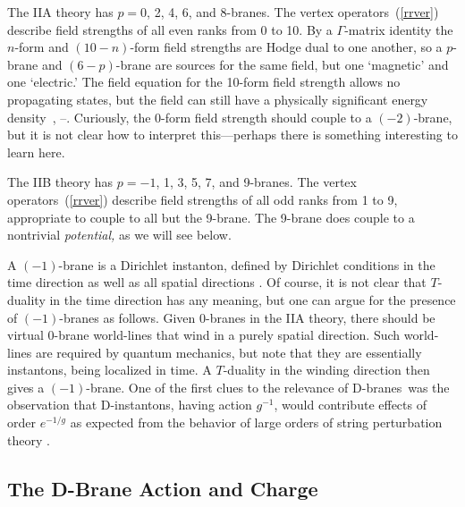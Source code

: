 \documentclass[12pt]{article}
\begin{document}
The IIA theory has $p = 0$, 2, 4, 6, and 8-branes.  The vertex
operators~(\ref{rrver}) describe field strengths of all even ranks from 0
to 10.  By a
$\Gamma$-matrix identity the $n$-form and $(10-n)$-form field strengths
are Hodge dual to one another, so a $p$-brane and $(6-p)$-brane are
sources for the same field, but one `magnetic' and one `electric.'  The field
equation for the 10-form field strength allows no propagating states, but
the field can still have a physically significant energy
density~\cite{joeone}, \cite{romans}--\cite{joeandy}. 
Curiously, the 0-form field strength should couple to a $(-2)$-brane, but it
is not clear how to interpret this---perhaps there is something interesting
to learn here. 

The IIB theory has $p = -1$, 1, 3, 5, 7, and 9-branes.  The vertex 
operators~(\ref{rrver}) describe field strengths of all odd ranks from 1 to
9, appropriate to couple to all but the 9-brane.  The 9-brane does couple to
a nontrivial {\it potential,} as we will see below.

A $(-1)$-brane is a
Dirichlet instanton, defined by Dirichlet conditions in the time direction
as well as all spatial directions \cite{parton}. Of course, it is not clear
that
$T$-duality in the time direction has any meaning, but one can argue for
the presence of $(-1)$-branes as follows.  Given $0$-branes in the IIA
theory, there should be virtual $0$-brane world-lines that wind in a
purely spatial direction.  Such world-lines are required by quantum
mechanics, but note that they are essentially instantons, being localized
in time.  A $T$-duality in the winding direction then gives a $(-1)$-brane.
One of the first clues to the relevance of D-branes\, \cite{joecomb} was the
observation that D-instantons, having action $g^{-1}$, would contribute
effects of order $e^{-1/g}$ as expected from the behavior of large orders of
string perturbation theory \cite{shenk1}.

\subsection{The D-Brane Action and Charge}
\end{document}

